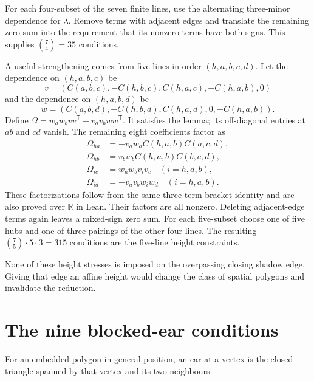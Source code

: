 \documentclass[11pt]{article}
\newcommand{\R}{\mathbb R}
\begin{document}
For each four-subset of the seven finite lines, use the alternating
three-minor dependence for $\lambda$. Remove terms with adjacent edges
and translate the remaining zero sum into the requirement that its
nonzero terms have both signs. This supplies $\binom74=35$ conditions.

A useful strengthening comes from five lines in order $(h,a,b,c,d)$.
Let the dependence on $(h,a,b,c)$ be
\[
 v=(C(a,b,c),-C(h,b,c),C(h,a,c),-C(h,a,b),0)
\]
and the dependence on $(h,a,b,d)$ be
\[
 w=(C(a,b,d),-C(h,b,d),C(h,a,d),0,-C(h,a,b)).
\]
Define $\Omega=w_aw_bvv^{\mathsf T}-v_av_bww^{\mathsf T}$.
It satisfies the lemma; its off-diagonal entries at $ab$ and $cd$
vanish. The remaining eight coefficients factor as
\begin{align*}
 \Omega_{ha}&=-v_aw_a C(h,a,b)C(a,c,d),\\
 \Omega_{hb}&= v_bw_b C(h,a,b)C(b,c,d),\\
 \Omega_{ic}&=w_aw_bv_iv_c\quad(i=h,a,b),\\
 \Omega_{id}&=-v_av_bw_iw_d\quad(i=h,a,b).
\end{align*}
These factorizations follow from the same three-term bracket identity
and are also proved over $\R$ in Lean. Their factors are all nonzero.
Deleting adjacent-edge terms again leaves a mixed-sign zero sum.
For each five-subset choose one of five hubs and one of three pairings
of the other four lines. The resulting $\binom75\cdot5\cdot3=315$
conditions are the five-line height constraints.

None of these height stresses is imposed on the overpassing closing
shadow edge. Giving that edge an affine height would change the class
of spatial polygons and invalidate the reduction.

\section{The nine blocked-ear conditions}\label{sec:ears}
For an embedded polygon in general position, an ear at a vertex is the
closed triangle spanned by that vertex and its two neighbours.
\end{document}

